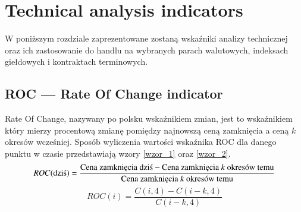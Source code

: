 

\chapter{Technical analysis indicators}
\label{Indicators} %

W poniższym rozdziale zaprezentowane zostaną wskaźniki analizy technicznej oraz ich zastosowanie do handlu na wybranych parach walutowych, indeksach giełdowych i kontraktach terminowych.

\section{ROC --- Rate Of Change indicator}
\label{sec:1ROC}
Rate Of Change, nazywany po polsku wskaźnikiem zmian, jest to wskaźnikiem który
mierzy procentową zmianę pomiędzy najnowszą ceną
zamknięcia a ceną $k$ okresów wcześniej. Sposób wyliczenia wartości wskaźnika ROC dla danego punktu w czasie przedstawiają wzory \ref{wzor_1} oraz \ref{wzor_2}.
\begin{equation}
ROC(\text{dziś}) = \frac{\text{Cena zamknięcia dziś} - \text{Cena zamknięcia } k \text{ okresów temu}}{\text{Cena zamknięcia } k \text{ okresów temu}}\\
\label{wzor_1}
\end{equation}
\begin{equation}
ROC(i) = \frac{C(i,4) - C(i-k,4)}{C(i-k,4)}
\label{wzor_2}
\end{equation}

